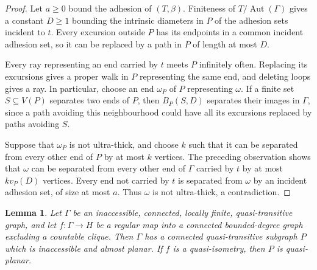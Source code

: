 \documentclass[10pt,a4paper]{amsart}
\newtheorem{lemma}[theorem]{Lemma}
\theoremstyle{definition}
\begin{document}
\begin{proof}
Let $a \geq 0$ bound the adhesion of $(T,\beta)$. Finiteness of $T/\operatorname{Aut}(\Gamma)$ gives a constant $D\geq1$ bounding the intrinsic diameters in $P$ of the adhesion sets incident to $t$. Every excursion outside $P$ has its endpoints in a common incident adhesion set, so it can be replaced by a path in $P$ of length at most $D$.

Every ray representing an end carried by $t$ meets $P$ infinitely often. Replacing its excursions gives a proper walk in $P$ representing the same end, and deleting loops gives a ray. In particular, choose an end $\omega_P$ of $P$ representing $\omega$. If a finite set $S\subseteq V(P)$ separates two ends of $P$, then $B_P(S,D)$ separates their images in $\Gamma$, since a path avoiding this neighbourhood could have all its excursions replaced by paths avoiding $S$.

Suppose that $\omega_P$ is not ultra-thick, and choose $k$ such that it can be separated from every other end of $P$ by at most $k$ vertices. The preceding observation shows that $\omega$ can be separated from every other end of $\Gamma$ carried by $t$ by at most $k v_P(D)$ vertices. Every end not carried by $t$ is separated from $\omega$ by an incident adhesion set, of size at most $a$. Thus $\omega$ is not ultra-thick, a contradiction.
\end{proof}


\begin{lemma}\label{prop:inaccessible-almost-planar-part}
Let $\Gamma$ be an inaccessible, connected, locally finite, quasi-transitive graph, and let $f:\Gamma\to H$ be a regular map into a connected bounded-degree graph excluding a countable clique.
Then $\Gamma$ has a connected quasi-transitive subgraph $P$ which is inaccessible and almost planar.
If $f$ is a quasi-isometry, then $P$ is quasi-planar.
\end{lemma}
\end{document}
